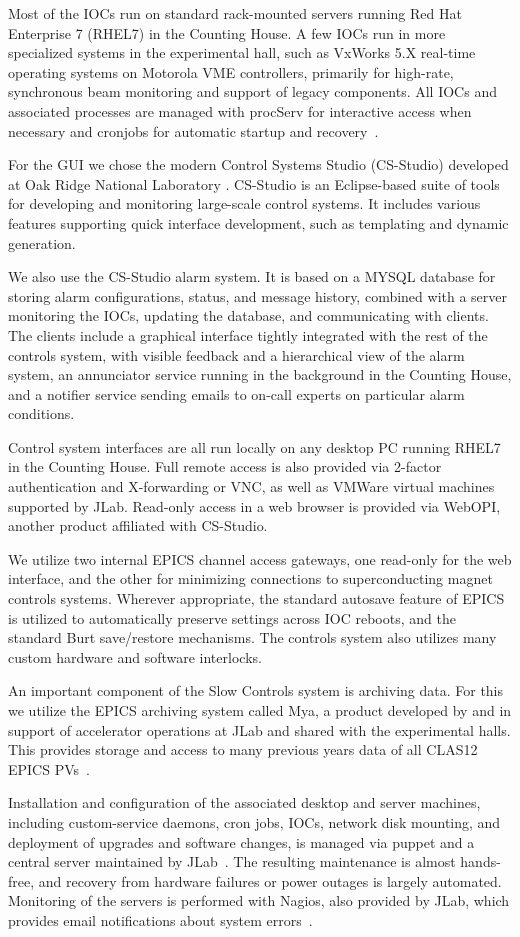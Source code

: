 Most of the IOCs run on standard rack-mounted servers running Red Hat Enterprise 7 (RHEL7) in the Counting House.
A few IOCs run in more specialized systems in the experimental hall, such as VxWorks 5.X real-time operating systems
on Motorola VME controllers, primarily for high-rate, synchronous beam monitoring and support of legacy components.
All IOCs and associated processes are managed with procServ for interactive access when necessary and cronjobs for
automatic startup and recovery~\cite{procserv-website}.

For the GUI we chose the modern Control Systems Studio (CS-Studio) developed at Oak Ridge National Laboratory
\cite{css-website}.   CS-Studio is an Eclipse-based suite of tools for developing and monitoring large-scale control
systems.  It includes various features supporting quick interface development, such as templating and dynamic generation.

We also use the CS-Studio alarm system.  It is based on a MYSQL database for storing alarm configurations, status,
and message history, combined with a server monitoring the IOCs, updating the database, and communicating with clients.
The clients include a graphical interface tightly integrated with the rest of the controls system, with visible feedback
and a hierarchical view of the alarm system, an annunciator service running in the background in the Counting House, and a
notifier service sending emails to on-call experts on particular alarm conditions.

Control system interfaces are all run locally on any desktop PC running RHEL7 in the Counting House. Full remote access is
also provided via 2-factor authentication and X-forwarding or VNC, as well as VMWare virtual machines supported by
JLab.  Read-only access in a web browser is provided via WebOPI, another product affiliated with CS-Studio.

We utilize two internal EPICS channel access gateways, one read-only for the web interface, and the other for minimizing
connections to superconducting magnet controls systems. Wherever appropriate, the standard autosave feature of EPICS
is utilized to automatically preserve settings across IOC reboots, and the standard Burt save/restore mechanisms. The
controls system also utilizes many custom hardware and software interlocks.

An important component of the Slow Controls system is archiving data.  For this we utilize the EPICS archiving system
called Mya, a product developed by and in support of accelerator operations at JLab and shared with the experimental
halls. This provides storage and access to many previous years data of all CLAS12 EPICS PVs~\cite{mya}.

Installation and configuration of the associated desktop and server machines, including custom-service daemons, cron
jobs, IOCs, network disk mounting, and deployment of upgrades and software changes, is managed via puppet and a
central server maintained by JLab~\cite{puppet-website}. The resulting maintenance is almost hands-free, and recovery
from hardware failures or power outages is largely automated.  Monitoring of the servers is performed with Nagios, also
provided by JLab, which provides email notifications about system errors~\cite{nagios-website}.

